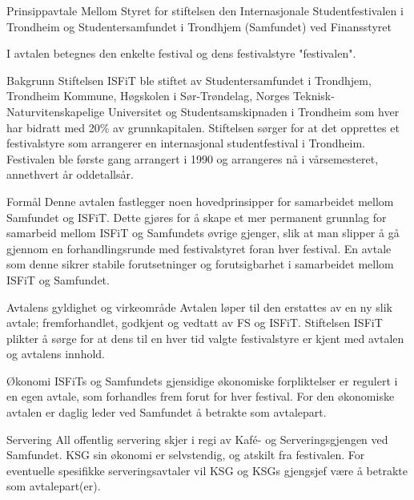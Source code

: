\begin{instruks*}{Prinsippavtale Mellom Styret for stiftelsen den Internasjonale Studentfestivalen i
        Trondheim og Studentersamfundet i Trondhjem (Samfundet) ved Finansstyret}

        I avtalen betegnes den enkelte festival og dens festivalstyre "festivalen".

    \begin{instruksledd}{Bakgrunn}
        Stiftelsen ISFiT ble stiftet av Studentersamfundet i Trondhjem, Trondheim Kommune, Høgskolen
        i Sør-Trøndelag, Norges Teknisk-Naturvitenskapelige Universitet og Studentsamskipnaden i Trondheim
        som hver har bidratt med 20\% av grunnkapitalen. Stiftelsen sørger for at det opprettes et
        festivalstyre som arrangerer en internasjonal studentfestival i Trondheim. Festivalen ble første
        gang arrangert i 1990 og arrangeres nå i vårsemesteret, annethvert år oddetallsår.
    \end{instruksledd}

    \begin{instruksledd}{Formål}
        Denne avtalen fastlegger noen hovedprinsipper for samarbeidet mellom Samfundet og ISFiT.
        Dette gjøres for å skape et mer permanent grunnlag for samarbeid mellom ISFiT og Samfundets øvrige
        gjenger, slik at man slipper å gå gjennom en forhandlingsrunde med festivalstyret foran hver
        festival. En avtale som denne sikrer stabile forutsetninger og forutsigbarhet i samarbeidet mellom
        ISFiT og Samfundet.
    \end{instruksledd}        

    \begin{instruksledd}{Avtalens gyldighet og virkeområde}
        Avtalen løper til den erstattes av en ny slik avtale; fremforhandlet, godkjent og
        vedtatt av FS og ISFiT. Stiftelsen ISFiT plikter å sørge for at dens til en hver tid valgte
        festivalstyre er kjent med avtalen og avtalens innhold.
    \end{instruksledd}

    \begin{instruksledd}{Økonomi}
        ISFiTs og Samfundets gjensidige økonomiske forpliktelser er regulert i en egen avtale, som
        forhandles frem forut for hver festival. For den økonomiske avtalen er daglig leder ved Samfundet å
        betrakte som avtalepart.
    \end{instruksledd}

    \begin{instruksledd}{Servering}
        All offentlig servering skjer i regi av Kaf\'e- og Serveringsgjengen ved Samfundet.
        KSG sin økonomi er selvstendig, og atskilt fra festivalen. For eventuelle
        spesifikke serveringsavtaler vil KSG og KSGs gjengsjef være å betrakte som avtalepart(er).
    \end{instruksledd}


\end{instruks*}
